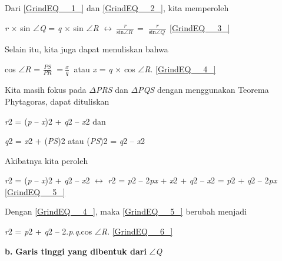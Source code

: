\documentclass[11pt,fleqn]{book} %
\begin{document}
\begin{myEnumerate}
\begin{itemize}
\noindent 

\noindent Dari \eqref{GrindEQ__1_} dan \eqref{GrindEQ__2_}, kita memperoleh

\noindent \textit{}

\noindent \textit{r }$\times$ sin $\mathrm{\angle }$\textit{Q }= \textit{q }$\times$ sin $\mathrm{\angle }$\textit{R  }$\mathrm{\leftrightarrow}$$\ \frac{r}{{\mathrm{sin} \mathrm{\angle }R\ }}$ = $\ \frac{r}{{\mathrm{sin} \mathrm{\angle }Q\ }}$      \eqref{GrindEQ__3_}

\noindent 

\noindent Selain itu, kita juga dapat menuliskan bahwa

\noindent 

\noindent cos $\mathrm{\angle }$\textit{R }= $\frac{PS}{PR}\ $\textit{ }=$\ \frac{x}{q}\ $ atau \textit{x }= \textit{q }$\times$ cos $\mathrm{\angle }$\textit{R}.      \eqref{GrindEQ__4_}

\noindent 

\noindent Kita masih fokus pada $\Delta$\textit{PRS }dan $\Delta$\textit{PQS }dengan menggunakan Teorema Phytagoras, dapat dituliskan

\noindent \textit{}

\noindent \textit{r}2 = (\textit{p }-- \textit{x})2 + \textit{q}2 -- \textit{x}2 dan

\noindent \textit{q}2 = \textit{x}2 + (\textit{PS})2 atau (\textit{PS})2 = \textit{q}2 -- \textit{x}2

\noindent 

\noindent Akibatnya kita peroleh

\noindent \textit{}

\noindent \textit{r}2 = (\textit{p }-- \textit{x})2 + \textit{q}2 -- \textit{x}2 $\mathrm{\leftrightarrow}$ \textit{r}2 = \textit{p}2 -- 2\textit{px }+ \textit{x}2 + \textit{q}2 -- \textit{x}2 = \textit{p}2 + \textit{q}2 -- 2\textit{px   }\eqref{GrindEQ__5_}

\noindent 

\noindent Dengan \eqref{GrindEQ__4_}, maka \eqref{GrindEQ__5_} berubah menjadi

\noindent \textit{}

\noindent \textit{r}2 = \textit{p}2 + \textit{q}2 -- 2.\textit{p}.\textit{q}.cos $\mathrm{\angle }$\textit{R}.         \eqref{GrindEQ__6_}

\noindent 

\noindent \textbf{b.} \textbf{Garis tinggi yang dibentuk dari }$\mathrm{\angle }$\textit{Q}


\end{itemize}
\end{myEnumerate}
\end{document}
